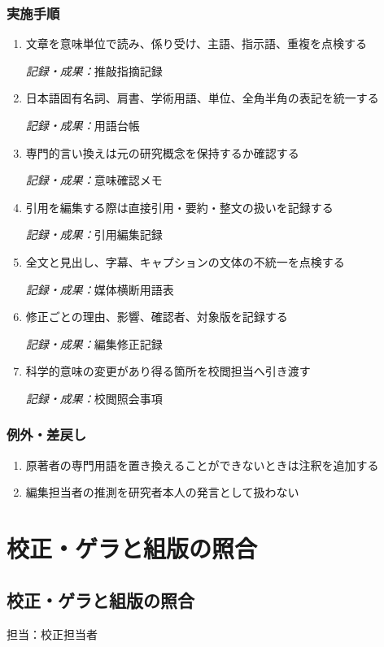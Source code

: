 \documentclass[a4paper,11pt]{article}
\begin{document}
\subsubsection*{実施手順}
\begin{enumerate}[leftmargin=2em,itemsep=0.65em]
\item 文章を意味単位で読み、係り受け、主語、指示語、重複を点検する\par\noindent\textit{記録・成果：}推敲指摘記録\nobreak\smallskip
\item 日本語固有名詞、肩書、学術用語、単位、全角半角の表記を統一する\par\noindent\textit{記録・成果：}用語台帳\nobreak\smallskip
\item 専門的言い換えは元の研究概念を保持するか確認する\par\noindent\textit{記録・成果：}意味確認メモ\nobreak\smallskip
\item 引用を編集する際は直接引用・要約・整文の扱いを記録する\par\noindent\textit{記録・成果：}引用編集記録\nobreak\smallskip
\item 全文と見出し、字幕、キャプションの文体の不統一を点検する\par\noindent\textit{記録・成果：}媒体横断用語表\nobreak\smallskip
\item 修正ごとの理由、影響、確認者、対象版を記録する\par\noindent\textit{記録・成果：}編集修正記録\nobreak\smallskip
\item 科学的意味の変更があり得る箇所を校閲担当へ引き渡す\par\noindent\textit{記録・成果：}校閲照会事項\nobreak\smallskip
\end{enumerate}
\subsubsection*{例外・差戻し}
\begin{enumerate}[leftmargin=2em,itemsep=0.35em]
\item 原著者の専門用語を置き換えることができないときは注釈を追加する
\item 編集担当者の推測を研究者本人の発言として扱わない
\end{enumerate}
\section{校正・ゲラと組版の照合}
\subsection{校正・ゲラと組版の照合}
\par 担当：校正担当者\par\medskip
\end{document}
